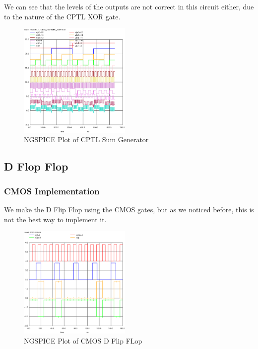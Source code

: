 \documentclass[conference]{IEEEtran}
\begin{document}
We can see that the levels of the outputs are not correct in this circuit either, due to the nature of the CPTL XOR gate.

\begin{figure}[H]
    \centering
    \includegraphics[width=0.48\textwidth]{images/sum_gen_optimized_tran.eps}
    \caption{NGSPICE Plot of CPTL Sum Generator}
\end{figure}

\subsection{D Flop Flop}

\subsubsection{CMOS Implementation}

We make the D Flip Flop using the CMOS gates, but as we noticed before, this is not the best way to implement it.

\begin{figure}[H]
    \centering
    \includegraphics[width=0.48\textwidth]{images/d_ff_cmos_tran.eps}
    \caption{NGSPICE Plot of CMOS D Flip FLop}
\end{figure}
\end{document}
